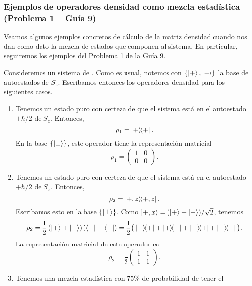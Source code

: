 \documentclass[10pt, a4paper]{article}
\numberwithin{equation}{subsection}
\begin{document}
\subsubsection{Ejemplos de operadores densidad como mezcla estadística
  (Problema 1 -- Guía 9)}
Veamos algunos ejemplos concretos de cálculo de la matriz densidad cuando nos
dan como dato la mezcla de estados que componen al sistema. En particular,
seguiremos los ejemplos del Problema 1 de la Guía 9.

Consideremos un sistema de \spinhalf. Como es usual, notemos con
$\set{\ket{+}, \ket{-}}$ la base de autoestados de $S_z$. Escribamos entonces
los operadores densidad para los siguientes casos.
\begin{enumerate}[label=(\alph*)]
  \item Tenemos un estado puro con certeza de que el sistema está en el
    autoestado $+\hbar/2$ de $S_z$. Entonces,
    \begin{equation}
      \rho_1 = \projector{+}.
    \end{equation}
    En la base $\set{\ket{\pm}}$, este operador tiene la representación
    matricial
    \begin{equation}
      \rho_1 = \begin{pmatrix} 1 & 0 \\ 0 & 0 \end{pmatrix}.
    \end{equation}
  \item Tenemos un estado puro con certeza de que el sistema está en el
    autoestado $+\hbar/2$ de $S_x$. Entonces,
    \begin{equation}
      \rho_2 = \projector{+,z}.
    \end{equation}
    Escribamos esto en la base $\set{\ket{\pm}}$. Como $\ket{+,x} = (\ket{+} +
    \ket{-})/\sqrt{2}$, tenemos
    \begin{equation}
      \rho_2 = \frac{1}{2}\left(\ket{+} + \ket{-}\right)
        \left(\bra{+} + \bra{-}\right)
      = \frac{1}{2}\big( \ketbra{+}{+} + \ketbra{+}{-} + \ketbra{-}{+} +
        \ketbra{-}{-} \big).
    \end{equation}
    La representación matricial de este operador es
    \begin{equation}
      \rho_2 = \frac{1}{2} \begin{pmatrix} 1 & 1 \\ 1 & 1 \end{pmatrix}.
    \end{equation}
  \item Tenemos una mezcla estadística con $75\%$ de probabilidad de tener el

\end{enumerate}
\end{document}
